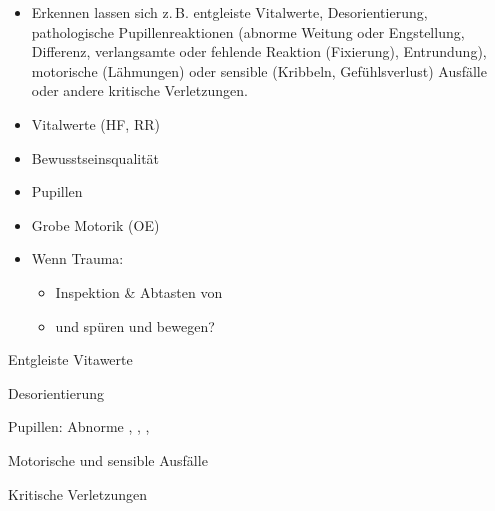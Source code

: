 \documentclass[
ngerman,
paper=a4,
asymmetric,
fontsize=10pt,
headings=small,
draft=false,
numbers=noenddot,
bibtotocnumbered,
footnotes=multiple,
]{scrreprt}
\begin{document}
{\begin{itemize}
  \item[\eye] Erkennen lassen sich z.\,B. entgleiste
Vitalwerte, Desorientierung, pathologische
Pupillenreaktionen (abnorme Weitung oder Engstellung,
Differenz, verlangsamte oder fehlende Reaktion (Fixierung),
Entrundung), motorische (Lähmungen) oder sensible (Kribbeln,
Gefühlsverlust) Ausfälle oder andere kritische Verletzungen.
\end{itemize}
}{
\begin{itemize}
  \item Vitalwerte (HF, RR)
  \item Bewusstseinsqualität
  \item Pupillen
  \item Grobe Motorik (OE)
  \item Wenn Trauma:
  \begin{itemize}
    \item Inspektion \& Abtasten von
    \item {} und  spüren und bewegen?
  \end{itemize}
\end{itemize}\begin{compactitem}
  \item[\eye] Entgleiste Vitawerte
  \item[\eye] Desorientierung
  \item[\eye] Pupillen: Abnorme , ,
  , 
  \item[\eye] Motorische und sensible Ausfälle
  \item[\eye] Kritische Verletzungen
\end{compactitem}
}{}{}{}
\end{document}
